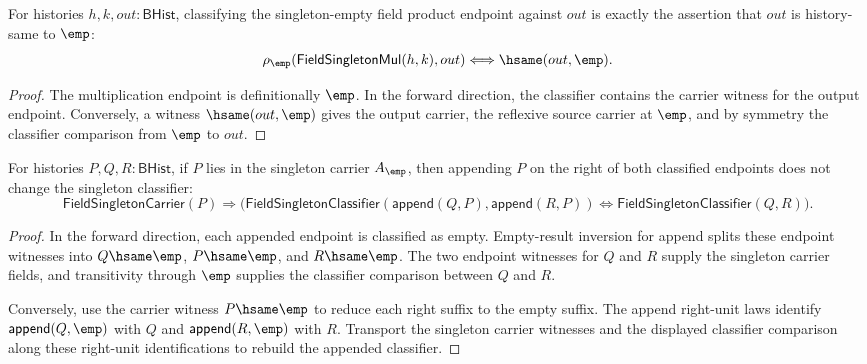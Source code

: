 \begin{theorem}
\label{thm:field-singleton-classifier-mul-empty-endpoint}
For histories $h,k,out:\mathsf{BHist}$, classifying the singleton-empty field
product endpoint against $out$ is exactly the assertion that $out$ is
history-same to $\emp$:
$$
\rho_{\emp}(\mathsf{FieldSingletonMul}(h,k),out)
\Longleftrightarrow
\hsame(out,\emp).
$$
\end{theorem}
\begin{proof}
The multiplication endpoint is definitionally $\emp$. In the forward
direction, the classifier contains the carrier witness for the output
endpoint. Conversely, a witness $\hsame(out,\emp)$ gives the output carrier,
the reflexive source carrier at $\emp$, and by symmetry the classifier
comparison from $\emp$ to $out$.
\end{proof}

\begin{theorem}
\label{thm:field-singleton-classifier-append-right-cancel}
For histories $P,Q,R:\mathsf{BHist}$, if $P$ lies in the singleton carrier
$A_{\emp}$, then appending $P$ on the right of both classified endpoints does
not change the singleton classifier:
$$
\mathsf{FieldSingletonCarrier}(P)\Rightarrow
\bigl(
\mathsf{FieldSingletonClassifier}(\mathsf{append}(Q,P),\mathsf{append}(R,P))
\Longleftrightarrow
\mathsf{FieldSingletonClassifier}(Q,R)
\bigr).
$$
\end{theorem}
\begin{proof}
In the forward direction, each appended endpoint is classified as empty.
Empty-result inversion for append splits these endpoint witnesses into
$Q\hsame\emp$, $P\hsame\emp$, and $R\hsame\emp$. The two endpoint witnesses for
$Q$ and $R$ supply the singleton carrier fields, and transitivity through
$\emp$ supplies the classifier comparison between $Q$ and $R$.

Conversely, use the carrier witness $P\hsame\emp$ to reduce each right suffix
to the empty suffix. The append right-unit laws identify
$\mathsf{append}(Q,\emp)$ with $Q$ and $\mathsf{append}(R,\emp)$ with $R$.
Transport the singleton carrier witnesses and the displayed classifier
comparison along these right-unit identifications to rebuild the appended
classifier.
\end{proof}
